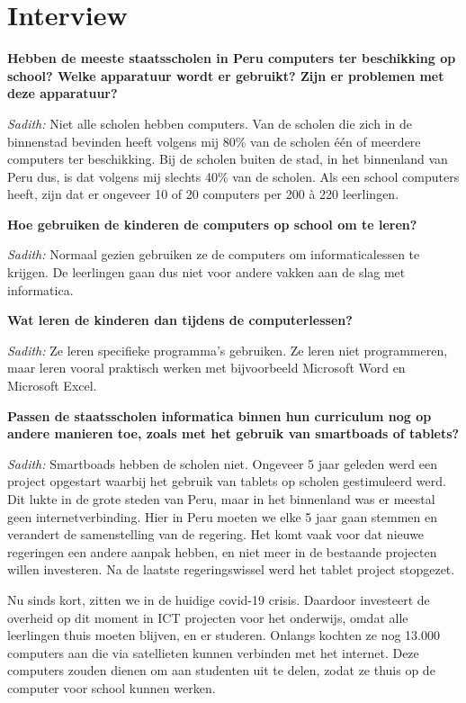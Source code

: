 \section{Interview}
\textbf{Hebben de meeste staatsscholen in Peru computers ter beschikking op school? Welke apparatuur wordt er gebruikt? Zijn er problemen met deze apparatuur?}

\textit{Sadith:} Niet alle scholen hebben computers. Van de scholen die zich in de binnenstad bevinden heeft volgens mij 80\% van de scholen één of meerdere computers ter beschikking. Bij de scholen buiten de stad, in het binnenland van Peru dus, is dat volgens mij slechts 40\% van de scholen. Als een school computers heeft, zijn dat er ongeveer 10 of 20 computers per 200 à 220 leerlingen.

\textbf{Hoe gebruiken de kinderen de computers op school om te leren?}

\textit{Sadith:} Normaal gezien gebruiken ze de computers om informaticalessen te krijgen. De leerlingen gaan dus niet voor andere vakken aan de slag met informatica. 

\textbf{Wat leren de kinderen dan tijdens de computerlessen?}

\textit{Sadith:} Ze leren specifieke programma's gebruiken. Ze leren niet programmeren, maar leren vooral praktisch werken met bijvoorbeeld Microsoft Word en Microsoft Excel.

\textbf{Passen de staatsscholen informatica binnen hun curriculum nog op andere manieren toe, zoals met het gebruik van smartboads of tablets?}

\textit{Sadith:} Smartboads hebben de scholen niet. Ongeveer 5 jaar geleden werd een project opgestart waarbij het gebruik van tablets op scholen gestimuleerd werd. Dit lukte in de grote steden van Peru, maar in het binnenland was er meestal geen internetverbinding. Hier in Peru moeten we elke 5 jaar gaan stemmen en verandert de samenstelling van de regering. Het komt vaak voor dat nieuwe regeringen een andere aanpak hebben, en niet meer in de bestaande projecten willen investeren. Na de laatste regeringswissel werd het tablet project stopgezet.

Nu sinds kort, zitten we in de huidige covid-19 crisis. Daardoor investeert de overheid op dit moment in ICT projecten voor het onderwijs, omdat alle leerlingen thuis moeten blijven, en er studeren. Onlangs kochten ze nog 13.000 computers aan die via satellieten kunnen verbinden met het internet. Deze computers zouden dienen om aan studenten uit te delen, zodat ze thuis op de computer voor school kunnen werken. 

